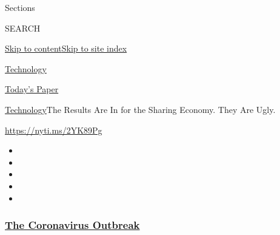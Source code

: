 Sections

SEARCH

\protect\hyperlink{site-content}{Skip to
content}\protect\hyperlink{site-index}{Skip to site index}

\href{https://www.nytimes3xbfgragh.onion/section/technology}{Technology}

\href{https://myaccount.nytimes3xbfgragh.onion/auth/login?response_type=cookie\&client_id=vi}{}

\href{https://www.nytimes3xbfgragh.onion/section/todayspaper}{Today's
Paper}

\href{/section/technology}{Technology}\textbar{}The Results Are In for
the Sharing Economy. They Are Ugly.

\url{https://nyti.ms/2YK89Pg}

\begin{itemize}
\item
\item
\item
\item
\item
\end{itemize}

\hypertarget{the-coronavirus-outbreak}{%
\subsubsection{\texorpdfstring{\href{https://www.nytimes3xbfgragh.onion/news-event/coronavirus?name=styln-coronavirus-markets\&region=TOP_BANNER\&block=storyline_menu_recirc\&action=click\&pgtype=Article\&impression_id=e5534310-f1c2-11ea-85e0-dd64533a7a3e\&variant=undefined}{The
Coronavirus
Outbreak}}{The Coronavirus Outbreak}}\label{the-coronavirus-outbreak}}

